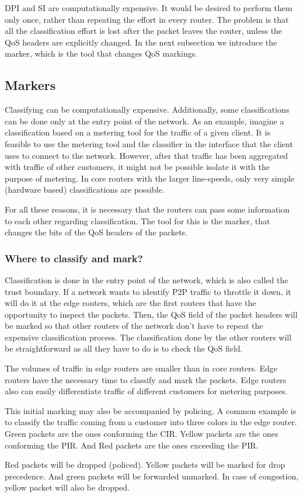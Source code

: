 DPI and SI are computationally expensive.
It would be desired to perform them only once, rather than repeating the effort in every router.
The problem is that all the classification effort is lost after the packet leaves the router, unless the QoS headers are explicitly changed.
In the next subsection we introduce the marker, which is the tool that changes QoS markings.

\subsection{Markers}

Classifying can be computationally expensive.
Additionally, some classifications can be done only at the entry point of the network.
As an example, imagine a classification based on a metering tool for the traffic of a given client.
It is feasible to use the metering tool and the classifier in the interface that the client uses to connect to the network.
However, after that traffic has been aggregated with traffic of other customers, it might not be possible isolate it with the purpose of metering.
In core routers with the larger line-speeds, only very simple (hardware based) classifications are possible.

For all these reasons, it is necessary that the routers can pass some information to each other regarding classification.
The tool for this is the marker, that changes the bits of the QoS headers of the packets.

\subsubsection{Where to classify and mark?}

Classification is done in the entry point of the network, which is also called the trust boundary.
If a network wants to identify P2P traffic to throttle it down, it will do it at the edge routers, which are the first routers that have the opportunity to inspect the packets.
Then, the QoS field of the packet headers will be marked so that other routers of the network don't have to repeat the expensive classification process.
The classification done by the other routers will be straightforward as all they have to do is to check the QoS field.

The volumes of traffic in edge routers are smaller than in core routers.
Edge routers have the necessary time to classify and mark the packets.
Edge routers also can easily differentiate traffic of different customers for metering purposes.

This initial marking may also be accompanied by policing.
A common example is to classify the traffic coming from a customer into three colors in the edge router.
Green packets are the ones conforming the CIR.
Yellow packets are the ones conforming the PIR.
And Red packets are the ones exceeding the PIR.

Red packets will be dropped (policed).
Yellow packets will be marked for drop precedence.
And green packets will be forwarded unmarked.
In case of congestion, yellow packet will also be dropped.


